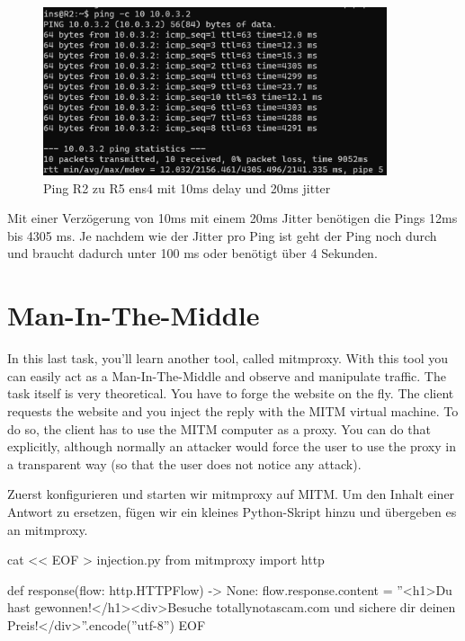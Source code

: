 \documentclass[11pt,titlepage]{article}
\newenvironment{shadedquotation}
 {\begin{shaded*}
  \quoting[leftmargin=0pt, vskip=0pt]
 }
 {\endquoting
 \end{shaded*}
}
\begin{document}
\begin{figure}[H]
  \begin{center}
  	\includegraphics[width=0.90\textwidth]{"images/Ping R2 to R5 10ms delay 20ms jitter"}
  	\caption{Ping R2 zu R5 ens4 mit 10ms delay und 20ms jitter}
  	\label{fig:Ping-R2-to-R5-10ms-delay-20ms-jitter}
  \end{center}
\end{figure}

Mit einer Verzögerung von 10ms mit einem 20ms Jitter benötigen die Pings 12ms bis 4305 ms. Je nachdem wie der Jitter pro Ping ist geht der Ping noch durch und braucht dadurch unter 100 ms oder benötigt über 4 Sekunden.

\section{Man-In-The-Middle}
\begin{shadedquotation}
	In this last task, you’ll learn another tool, called mitmproxy. With this tool you can easily act
	as a Man-In-The-Middle and observe and manipulate traffic. The task itself is very theoretical.
	You have to forge the website on the fly. The client requests the website and you inject the reply
	with the MITM virtual machine. To do so, the client has to use the MITM computer as a proxy.
	You can do that explicitly, although normally an attacker would force the user to use the proxy
	in a transparent way (so that the user does not notice any attack).
\end{shadedquotation}
Zuerst konfigurieren und starten wir mitmproxy auf MITM.
Um den Inhalt einer Antwort zu ersetzen, fügen wir ein kleines Python-Skript hinzu und übergeben es an mitmproxy.
\begin{shadedquotation}
	cat << EOF > injection.py
	from mitmproxy import http
	
	
	def response(flow: http.HTTPFlow) -> None:
	flow.response.content = ''<h1>Du hast gewonnen!</h1><div>Besuche totallynotascam.com und sichere dir deinen Preis!</div>''.encode(''utf-8'')
	EOF
	
\end{shadedquotation}
\end{document}
